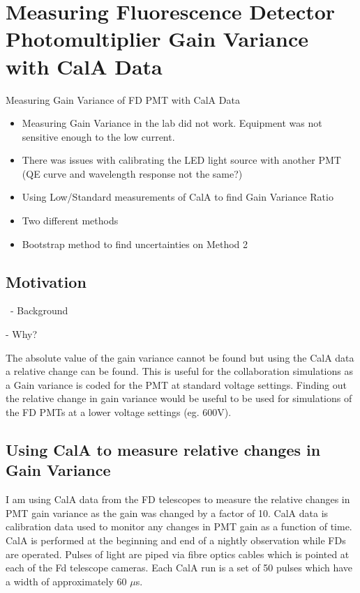 \chapter[Measuring FD PMT Gain Variance with CalA Data]{\centering Measuring Fluorescence Detector Photomultiplier Gain Variance with CalA Data \\}\label{Ch:GainVariance}

Measuring Gain Variance of FD PMT with CalA Data
\begin{itemize}
\item Measuring Gain Variance in the lab did not work. Equipment was not sensitive enough to the low current.
\item There was issues with calibrating the LED light source with another PMT (QE curve and wavelength response not the same?)
\item Using Low/Standard measurements of CalA to find Gain Variance Ratio
\item Two different methods
\item Bootstrap method to find uncertainties on Method 2
\end{itemize}

\section{Motivation}
\
- Background

- Why?

The absolute value of the gain variance cannot be found but using the CalA data a relative change can be found. This is useful for the collaboration simulations as a Gain variance is coded for the PMT at standard voltage settings. Finding out the relative change in gain variance would be useful to be used for simulations of the FD PMTs at a lower voltage settings (eg. 600V).

\section{Using CalA to measure relative changes in Gain Variance}

I am using CalA data from the FD telescopes to measure the relative changes in PMT gain variance as the gain was changed by a factor of 10. CalA data is calibration data used to monitor any changes in PMT gain as a function of time. CalA is performed at the beginning and end of a nightly observation while FDs are operated. Pulses of light are piped via fibre optics cables which is pointed at each of the Fd telescope cameras. Each CalA run is a set of 50 pulses which have a width of approximately 60 $\mu$s.

